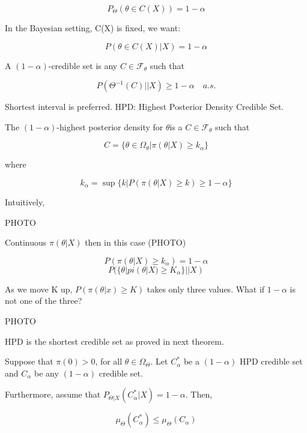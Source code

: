 \documentclass[11pt,fleqn]{book} %
\begin{document}
		$$P_\Theta(\theta \in C(X)) = 1 - \alpha $$

In the Bayesian setting, C(X) is fixed, we want: 

		$$P(\theta \in C(X)| X) = 1 - \alpha $$

\begin{definition}
	A $(1 - \alpha)$-credible set is any $C \in \mathcal{F}_\theta$ such that 

			$$P(\Theta^{-1}(C) || X) \geq 1 - \alpha\quad a.s.$$
\end{definition}

Shortest interval is preferred. HPD: Highest Posterior Density Credible Set. 

\begin{definition}
	The $(1 - \alpha)$-highest posterior density for $\theta$is a $C \in \mathcal{F}_\theta$ such that

			$$C = \{\theta \in \Omega_\theta | \pi(\theta|X) \geq k_\alpha \} $$

	where

			$$k_\alpha = \sup \{k| P(\pi(\theta|X) \geq k) \geq 1 - \alpha \} $$
\end{definition}

Intuitively, 

PHOTO

Continuous $\pi(\theta|X)$ then in this case (PHOTO) 

		$$P(\pi(\theta|X) \geq k_\alpha) = 1 - \alpha $$
		$$P(\{\theta| pi(\theta|X) \geq K_\alpha \}|| X) $$

As we move K up, $P(\pi(\theta|x) \geq K)$ takes only three values. What if $1-\alpha$ is not one of the three?

PHOTO

HPD is the shortest credible set as proved in next theorem.

\begin{theorem}[2.4]
	Suppose that $\pi(0) > 0 $, for all $\theta \in \Omega_\Theta$. Let $C_\alpha^*$ be a $(1 - \alpha)$ HPD credible set and $C_\alpha$ be any $(1-\alpha)$ credible set. 

	Furthermore, assume that $P_{\Theta|X}(C_\alpha^*|X) = 1 - \alpha$. Then, 

			$$\mu_\Theta(C^*_\alpha) \leq \mu_\Theta(C_\alpha) $$
\end{theorem}
\end{document}
